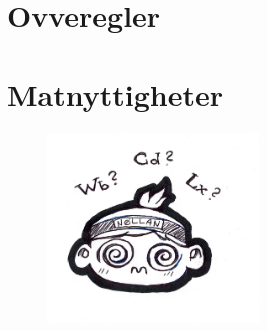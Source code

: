 














\chapter{Ovveregler}



\newpage


\chapter{Matnyttigheter}


\begin{figure}[H]
    \centering
    \includegraphics[width=0.5\textwidth]{nollan_vaaa.png}
\end{figure}

\newpage






